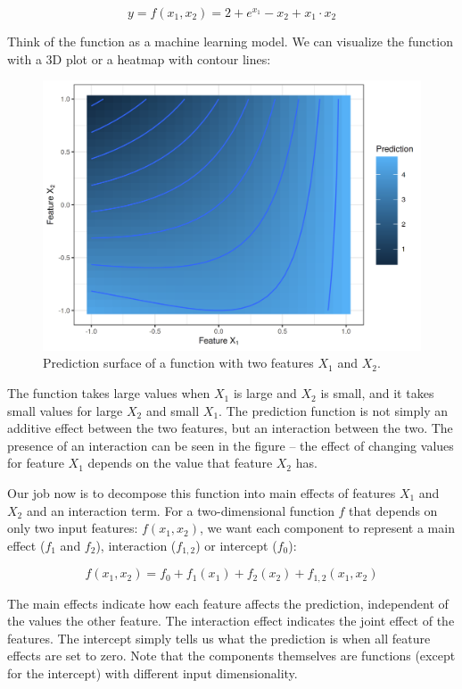 \documentclass[12pt,]{krantz}
\begin{document}
\[y = f(x_1, x_2) = 2 + e^{x_1} - x_2 + x_1 \cdot x_2\]

Think of the function as a machine learning model. We can visualize the
function with a 3D plot or a heatmap with contour lines:

\begin{figure}

{\centering \includegraphics[width=\textwidth]{images/unnamed-chunk-16-1} 

}

\caption{Prediction surface of a function with two features $X_1$ and $X_2$.}\label{fig:unnamed-chunk-16}
\end{figure}

The function takes large values when \(X_1\) is large and \(X_2\) is
small, and it takes small values for large \(X_2\) and small \(X_1\).
The prediction function is not simply an additive effect between the two
features, but an interaction between the two. The presence of an
interaction can be seen in the figure -- the effect of changing values
for feature \(X_1\) depends on the value that feature \(X_2\) has.

Our job now is to decompose this function into main effects of features
\(X_1\) and \(X_2\) and an interaction term. For a two-dimensional
function \(f\) that depends on only two input features: \(f(x_1, x_2)\),
we want each component to represent a main effect (\(f_1\) and \(f_2\)),
interaction (\(f_{1,2}\)) or intercept (\(f_0\)):

\[f(x_1, x_2) = f_0 + f_1(x_1) + f_2(x_2) + f_{1,2}(x_{1},x_{2})\]

The main effects indicate how each feature affects the prediction,
independent of the values the other feature. The interaction effect
indicates the joint effect of the features. The intercept simply tells
us what the prediction is when all feature effects are set to zero. Note
that the components themselves are functions (except for the intercept)
with different input dimensionality.
\end{document}
